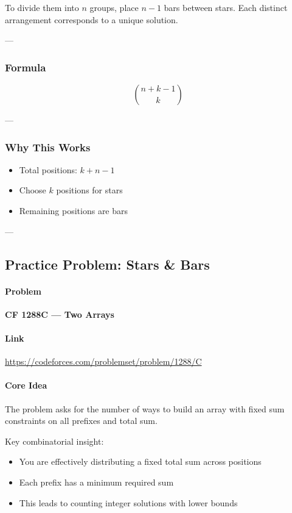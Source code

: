 \documentclass[11pt]{article}
\begin{document}
To divide them into $n$ groups, place $n-1$ bars between stars.
Each distinct arrangement corresponds to a unique solution.

---

\subsubsection{Formula}
\[
\boxed{\binom{n + k - 1}{k}}
\]

---

\subsubsection{Why This Works}
\begin{itemize}
    \item Total positions: $k + n - 1$
    \item Choose $k$ positions for stars
    \item Remaining positions are bars
\end{itemize}

---

\subsection{Practice Problem: Stars \& Bars}

\paragraph{Problem}
\textbf{CF 1288C — Two Arrays}

\paragraph{Link}
\url{https://codeforces.com/problemset/problem/1288/C}

\paragraph{Core Idea}

The problem asks for the number of ways to build an array with fixed sum
constraints on all prefixes and total sum.

Key combinatorial insight:
\begin{itemize}
    \item You are effectively distributing a fixed total sum across positions
    \item Each prefix has a minimum required sum
    \item This leads to counting integer solutions with lower bounds
\end{itemize}
\end{document}
